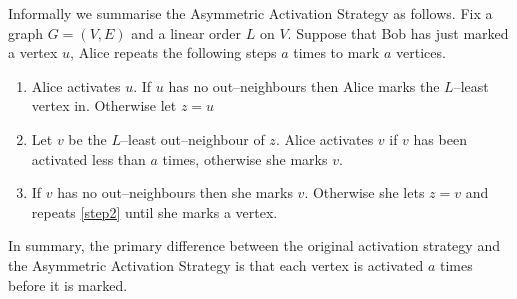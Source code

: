 Informally we summarise the Asymmetric Activation Strategy as follows. Fix a graph $G=(V,E)$ and a linear order $L$ on $V$. Suppose that Bob has just marked a vertex $u$, Alice repeats the following steps $a$ times to mark $a$ vertices.
\begin{enumerate}
    \item Alice activates $u$. If $u$ has no out--neighbours then Alice marks the $L$--least vertex in. Otherwise let $z=u$
    
    \item Let $v$ be the $L$--least out--neighbour of $z$. Alice activates $v$ if $v$ has been activated less than $a$ times, otherwise she marks $v$. \label{step2}
    
    \item If $v$ has no out--neighbours then she marks $v$. Otherwise she lets $z=v$ and repeats \ref{step2} until she marks a vertex.     
\end{enumerate}
In summary, the primary difference between the original activation strategy and the Asymmetric Activation Strategy is that each vertex is activated $a$ times before it is marked.


